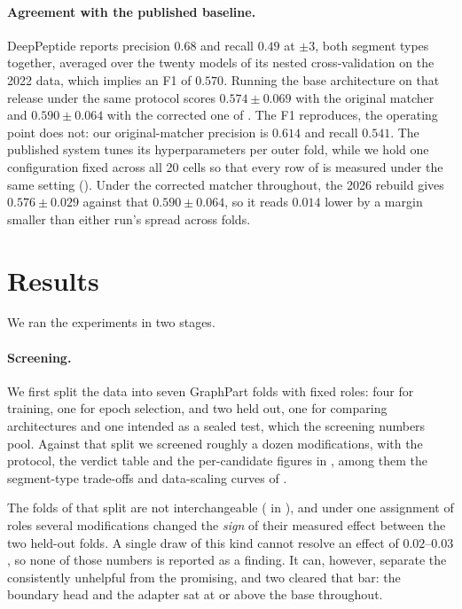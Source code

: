 \documentclass{article}
\begin{document}
\paragraph{Agreement with the published baseline.} DeepPeptide reports precision $0.68$ and recall $0.49$ at $\pm3$, both segment types together, averaged over the twenty models of its nested cross-validation on the 2022 data, which implies an F1 of $0.570$. Running the base architecture on that release under the same protocol scores $0.574\pm0.069$ with the original matcher and $0.590\pm0.064$ with the corrected one of . The F1 reproduces, the operating point does not: our original-matcher precision is $0.614$ and recall $0.541$. The published system tunes its hyperparameters per outer fold, while we hold one configuration fixed across all 20 cells so that every row of  is measured under the same setting (). Under the corrected matcher throughout, the 2026 rebuild gives $0.576\pm0.029$ against that $0.590\pm0.064$, so it reads $0.014$ lower by a margin smaller than either run's spread across folds.


\section{Results}
\label{sec:results}

We ran the experiments in two stages. 
 
\paragraph{Screening.} We first split the data into seven GraphPart folds with fixed roles:
four for training, one for epoch selection, and two held out, one for comparing architectures and
one intended as a sealed test, which the screening numbers pool.
Against that split we screened roughly a dozen modifications, with the protocol, the verdict table
and the per-candidate figures in , among them the segment-type
trade-offs and data-scaling curves of .
 
The folds of that split are not interchangeable ( in ), and under one assignment of
roles several modifications changed the \emph{sign} of their measured effect between the two
held-out folds. A single draw of this kind cannot resolve an effect of $0.02$--$0.03$, so none of
those numbers is reported as a finding. It can, however, separate the consistently unhelpful
from the promising, and two cleared that bar: the boundary head and the adapter sat at or
above the base throughout.
 
\end{document}
